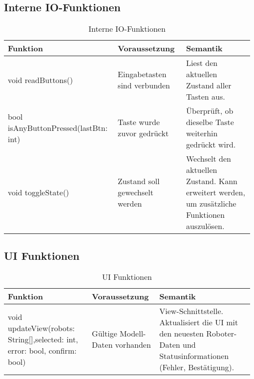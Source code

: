 \subsection{Interne IO-Funktionen}
\begin{table}[h!]
    \centering
    \begin{tabular}{|p{5cm}|p{5cm}|p{5cm}|}
        \hline
        \textbf{Funktion} & \textbf{Voraussetzung} & \textbf{Semantik} \\
        \hline
        void readButtons() & Eingabetasten sind verbunden & Liest den aktuellen Zustand aller Tasten aus. \\
        \hline
        bool isAnyButtonPressed(lastBtn: int) & Taste wurde zuvor gedrückt & Überprüft, ob dieselbe Taste weiterhin gedrückt wird.\\
        \hline
        void toggleState() & Zustand soll gewechselt werden & Wechselt den aktuellen Zustand. Kann erweitert werden, um zusätzliche Funktionen auszulösen. \\
        \hline
    \end{tabular}
    \caption{Interne IO-Funktionen}
    \label{tab:interneIOFunktionen}
\end{table}


\clearpage
\subsection{UI Funktionen}
\begin{table}[h!]
    \centering
    \begin{tabular}{|p{5cm}|p{5cm}|p{5cm}|}
        \hline
        \textbf{Funktion} & \textbf{Voraussetzung} & \textbf{Semantik} \\
        \hline
        void updateView(robots: String[],selected: int, error: bool, confirm: bool) & Gültige Modell-Daten vorhanden & View-Schnittstelle. Aktualisiert die UI mit den neuesten Roboter-Daten und Statusinformationen (Fehler, Bestätigung). \\ 
        \hline
    \end{tabular}
    \caption{UI Funktionen}
    \label{tab:UIFunktionen}
\end{table}


